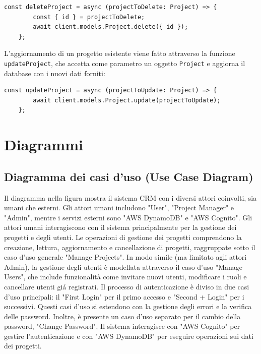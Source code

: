 \documentclass[target=bach,aauheader=,style=]{thud}
\begin{document}
\begin{lstlisting}[caption=funzione \texttt{deleteProject}]
    const deleteProject = async (projectToDelete: Project) => {
        const { id } = projectToDelete;
        await client.models.Project.delete({ id });
    };
\end{lstlisting}

L'aggiornamento di un progetto esistente viene fatto  attraverso la funzione \texttt{updateProject}, che accetta come parametro un oggetto \texttt{Project} e aggiorna il database con i nuovi dati forniti:

\begin{lstlisting}[caption=funzione \texttt{updateProject}]
    const updateProject = async (projectToUpdate: Project) => {
        await client.models.Project.update(projectToUpdate);
    };
\end{lstlisting}

\section{Diagrammi}
\subsection{Diagramma dei casi d'uso (Use Case Diagram)}
Il diagramma nella figura mostra il sistema CRM con i diversi attori coinvolti, sia umani che esterni. Gli attori umani includono "User", "Project Manager" e "Admin", mentre i servizi esterni sono "AWS DynamoDB" e "AWS Cognito". Gli attori umani interagiscono con il sistema principalmente per la gestione dei progetti e degli utenti. Le operazioni di gestione dei progetti comprendono la creazione, lettura, aggiornamento e cancellazione di progetti, raggruppate sotto il caso d'uso generale "Manage Projects". In modo simile (ma limitato agli attori Admin), la gestione degli utenti è modellata attraverso il caso d'uso "Manage Users", che include funzionalità come invitare nuovi utenti, modificare i ruoli e cancellare utenti giá registrati. Il processo di autenticazione è diviso in due casi d'uso principali: il "First Login" per il primo accesso e "Second + Login" per i successivi. Questi casi d'uso si estendono con la gestione degli errori e la verifica delle password. Inoltre, è presente un caso d'uso separato per il cambio della password, "Change Password". Il sistema interagisce con "AWS Cognito" per gestire l'autenticazione e con "AWS DynamoDB" per eseguire operazioni sui dati dei progetti.
\end{document}
